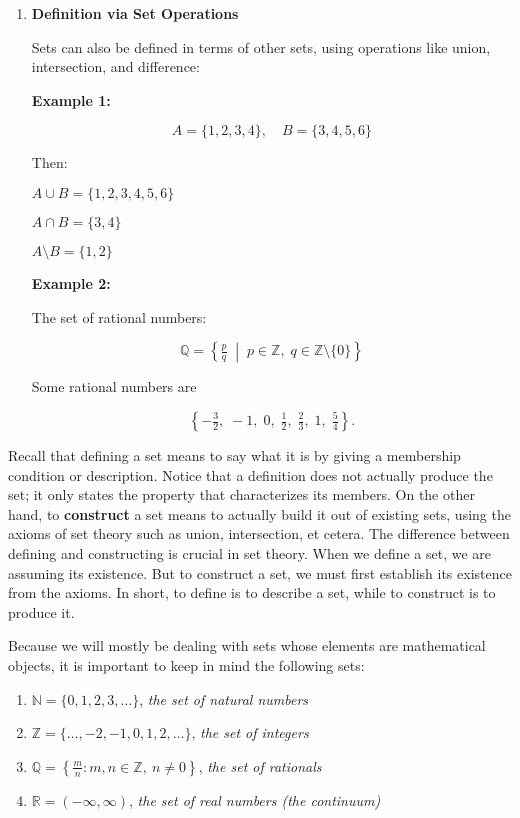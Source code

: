 \documentclass[12pt,a4paper,openany]{article}
\begin{document}
\begin{enumerate}
    \item \textbf{Definition via Set Operations}
    
    Sets can also be defined in terms of other sets, using operations like union, intersection, and difference:
    
    \textbf{Example 1:}
    
    $$A = \{1, 2, 3, 4\}, \quad B = \{3, 4, 5, 6\}$$
    
    Then:
    
    $A \cup B = \{1, 2, 3, 4, 5, 6\}$
    
    $A \cap B = \{3, 4\}$
    
    $A \setminus B = \{1, 2\}$
    
    \textbf{Example 2:}
    
    The set of rational numbers:
    
    $$ \mathbb{Q} = \left\{ \tfrac{p}{q} \;\middle|\; p \in \mathbb{Z}, \; q \in \mathbb{Z} \setminus \{0\} \right\} $$
    
    Some rational numbers are
    
    $$\left\{ -\tfrac{3}{2}, \; -1, \; 0, \; \tfrac{1}{2}, \; \tfrac{2}{3}, \; 1, \; \tfrac{5}{4} \right\}.$$
\end{enumerate}

Recall that defining a set means to say what it is by giving a membership condition or description. Notice that a definition does not actually produce the set; it only states the property that characterizes its members. On the other hand, to \textbf{construct} a set means to actually build it out of existing sets, using the axioms of set theory such as union, intersection, et cetera. The difference between defining and constructing is crucial in set theory. When we define a set, we are assuming its existence. But to construct a set, we must first establish its existence from the axioms. In short, to define is to describe a set, while to construct is to produce it.

Because we will mostly be dealing with sets whose elements are mathematical objects, it is important to keep in mind the following sets:

\begin{enumerate}
    \item $\mathbb{N} = \{0, 1, 2, 3, \dots\}$, \textit{the set of natural numbers}
    \item $\mathbb{Z} = \{\dots, -2, -1, 0, 1, 2, \dots\}$, \textit{the set of integers}
    \item $\mathbb{Q} = \left\{ \tfrac{m}{n} : m, n \in \mathbb{Z},\ n \ne 0 \right\}$, \textit{the set of rationals}
    \item $\mathbb{R} = (-\infty, \infty)$, \textit{the set of real numbers (the continuum)}
\end{enumerate}
\end{document}
